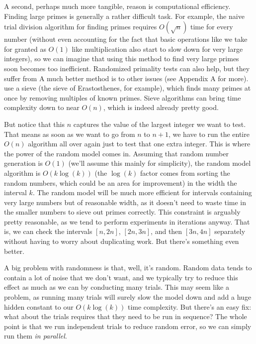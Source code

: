 \documentclass[conference]{IEEEtran}
\begin{document}
A second, perhaps much more tangible, reason is
computational efficiency. Finding large primes is
generally a rather difficult task. For example, the naive
trial division algorithm for finding primes requires
$O(\sqrt{n})$ time for every number (without even
accounting for the fact that basic operations like
we take for granted as $O(1)$ like multiplication also
start to slow down for very large integers),
so we can imagine that
using this method to find very large primes soon becomes
too inefficient.
Randomized primality tests can also help, but they suffer from
A much better method is to
other issues (see Appendix A for more).
use a sieve (the sieve of Erastosthenes, for example),
which finds many primes at once by removing multiples of
known primes. Sieve algorithms can bring time complexity
down to near $O(n)$, which is indeed already pretty good.

But notice that this $n$ captures the value of the largest
integer we want to test. That means as soon as we want
to go from $n$ to $n + 1$, we have to run the entire
$O(n)$ algorithm all over again just to test that one
extra integer. This is where the power of the random
model comes in. Assuming that random number generation
is $O(1)$ (we'll assume this mainly for simplicity),
the random model algorithm is $O(k \log(k))$ (the
$\log(k)$ factor comes from sorting the random numbers,
which could be an area for improvement) in the
width the interval $k$. The random model will be much
more efficient for intervals containing very large
numbers but of reasonable width, as it doesn't need to
waste time in the smaller numbers to sieve out primes
correctly. This constraint is arguably pretty reasonable,
as we tend to perform experiments in iterations anyway.
That is, we can check the intervals $[n, 2n]$, $[2n, 3n]$,
and then $[3n, 4n]$ separately without having to worry
about duplicating work. But there's something even better.

A big problem with randomness is that, well, it's random.
Random data tends to contain a lot of noise that we don't
want, and we typically try to reduce this effect as much
as we can by conducting many trials. This may seem like
a problem, as running many trials will surely slow the
model down and add a huge hidden constant to our
$O(k \log(k))$ time complexity. But there's an easy fix:
what about the trials requires that they need to be run
in sequence? The whole point is that we run independent
trials to reduce random error, so we can simply
run them \textit{in parallel}.
\end{document}
